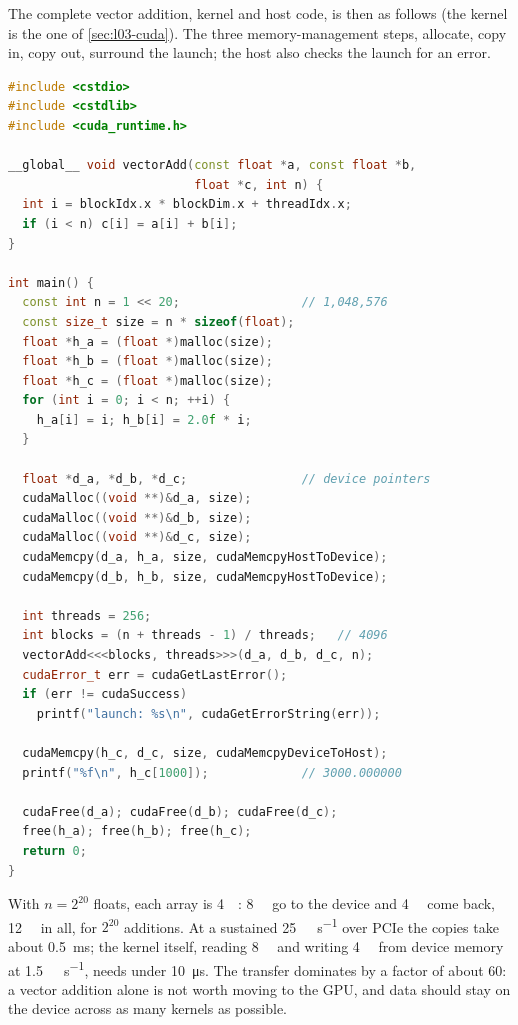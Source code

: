 \documentclass[../main.tex]{subfiles}
\begin{document}
The complete vector addition, kernel and host code, is then as follows
(the kernel is the one of \cref{sec:l03-cuda}).  The three
memory-management steps, allocate, copy in, copy out, surround the
launch; the host also checks the launch for an error.
\begin{lstlisting}[language=C++, numbers=none]
#include <cstdio>
#include <cstdlib>
#include <cuda_runtime.h>

__global__ void vectorAdd(const float *a, const float *b,
                          float *c, int n) {
  int i = blockIdx.x * blockDim.x + threadIdx.x;
  if (i < n) c[i] = a[i] + b[i];
}

int main() {
  const int n = 1 << 20;                 // 1,048,576
  const size_t size = n * sizeof(float);
  float *h_a = (float *)malloc(size);
  float *h_b = (float *)malloc(size);
  float *h_c = (float *)malloc(size);
  for (int i = 0; i < n; ++i) {
    h_a[i] = i; h_b[i] = 2.0f * i;
  }

  float *d_a, *d_b, *d_c;                // device pointers
  cudaMalloc((void **)&d_a, size);
  cudaMalloc((void **)&d_b, size);
  cudaMalloc((void **)&d_c, size);
  cudaMemcpy(d_a, h_a, size, cudaMemcpyHostToDevice);
  cudaMemcpy(d_b, h_b, size, cudaMemcpyHostToDevice);

  int threads = 256;
  int blocks = (n + threads - 1) / threads;   // 4096
  vectorAdd<<<blocks, threads>>>(d_a, d_b, d_c, n);
  cudaError_t err = cudaGetLastError();
  if (err != cudaSuccess)
    printf("launch: %s\n", cudaGetErrorString(err));

  cudaMemcpy(h_c, d_c, size, cudaMemcpyDeviceToHost);
  printf("%f\n", h_c[1000]);             // 3000.000000

  cudaFree(d_a); cudaFree(d_b); cudaFree(d_c);
  free(h_a); free(h_b); free(h_c);
  return 0;
}
\end{lstlisting}

\begin{example}
  \label{ex:l03-copy-cost}
  With $n = 2^{20}$ floats, each array is \SI{4}{\mebi\byte}: \SI{8}{\mebi\byte}
  go to the device and \SI{4}{\mebi\byte} come back, \SI{12}{\mebi\byte} in
  all, for $2^{20}$ additions.  At a sustained
  \SI{25}{\giga\byte\per\second} over PCIe the copies take about
  \SI{0.5}{\milli\second}; the kernel itself, reading \SI{8}{\mebi\byte}
  and writing \SI{4}{\mebi\byte} from device memory at
  \SI{1.5}{\tera\byte\per\second}, needs under
  \SI{10}{\micro\second}.  The transfer dominates by a factor of about
  60: a vector addition alone is not worth moving to the GPU, and data
  should stay on the device across as many kernels as possible.
\end{example}
\end{document}
